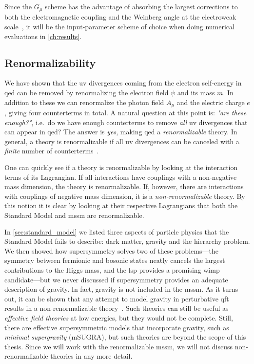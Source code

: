 Since the $G_\mu$ scheme has the advantage of absorbing the largest corrections to both the electromagnetic coupling and the Weinberg angle at the electroweak scale~\cite{Denner:2019vbn}, it will be the input-parameter scheme of choice when doing numerical evaluations in \cref{ch:results}.


\subsection{Renormalizability}
We have shown that the \gls{uv} divergences coming from the electron self-energy in \gls{qed} can be removed by renormalizing the electron field $\psi$ and its mass $m$.
In addition to these we can renormalize the photon field $A_\mu$ and the electric charge $e$, giving four counterterms in total.
A natural question at this point is: \textit{"are these enough?"}, i.e.\ do we have enough counterterms to remove \emph{all} \gls{uv} divergences that can appear in \gls{qed}?
The answer is \emph{yes}, making \gls{qed} a \emph{renormalizable} theory.
In general, a theory is renormalizable if all \gls{uv} divergences can be canceled with a \emph{finite} number of counterterms~\cite{Schwartz:2014sze}.

One can quickly see if a theory is renormalizable by looking at the interaction terms of its Lagrangian.
If all interactions have couplings with a non-negative mass dimension, the theory is renormalizable. If, however, there are interactions with couplings of negative mass dimension, it is a \emph{non-renormalizable} theory.
By this notion it is clear by looking at their respective Lagrangians that both the Standard Model and \gls{mssm} are renormalizable.

In \cref{sec:standard_model} we listed three aspects of particle physics that the Standard Model fails to describe: dark matter, gravity and the hierarchy problem. We then showed how supersymmetry solves two of these problems---the symmetry between fermionic and bosonic states neatly cancels the largest contributions to the Higgs mass, and the \gls{lsp} provides a promising \gls{wimp} candidate---but we never discussed if supersymmetry provides an adequate description of gravity.
In fact, gravity is not included in the \gls{mssm}.
As it turns out, it can be shown that any attempt to model gravity in perturbative \gls{qft} results in a non-renormalizable theory~\cite{Schwartz:2014sze}.
Such theories can still be useful as \emph{effective field theories} at low energies, but they would not be complete.
Still, there are effective supersymmetric models that incorporate gravity, such as \emph{minimal supergravity} (mSUGRA), but such theories are beyond the scope of this thesis.
Since we will work with the renormalizable \gls{mssm}, we will not discuss non-renormalizable theories in any more detail.



